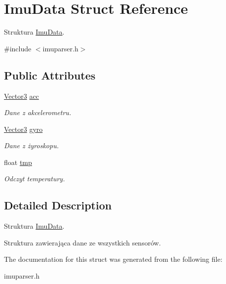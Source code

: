 \hypertarget{struct_imu_data}{}\section{Imu\+Data Struct Reference}
\label{struct_imu_data}


Struktura \mbox{\hyperlink{struct_imu_data}{Imu\+Data}}.  




{\ttfamily \#include $<$imuparser.\+h$>$}

\subsection*{Public Attributes}
\begin{DoxyCompactItemize}
\item 
\mbox{\label{struct_imu_data_af23da6309d3dc0dea3b76928a88c0200}} 
\mbox{\hyperlink{struct_vector3}{Vector3}} \mbox{\hyperlink{struct_imu_data_af23da6309d3dc0dea3b76928a88c0200}{acc}}
\begin{DoxyCompactList}\small\item\em Dane z akcelerometru. \end{DoxyCompactList}\item 
\mbox{\label{struct_imu_data_ad8f058e5c598956fee0edb4a4fd4ee26}} 
\mbox{\hyperlink{struct_vector3}{Vector3}} \mbox{\hyperlink{struct_imu_data_ad8f058e5c598956fee0edb4a4fd4ee26}{gyro}}
\begin{DoxyCompactList}\small\item\em Dane z żyroskopu. \end{DoxyCompactList}\item 
\mbox{\label{struct_imu_data_acdfc7ba573b3a40af9cb8c4d067c5a91}} 
float \mbox{\hyperlink{struct_imu_data_acdfc7ba573b3a40af9cb8c4d067c5a91}{tmp}}
\begin{DoxyCompactList}\small\item\em Odczyt temperatury. \end{DoxyCompactList}\end{DoxyCompactItemize}


\subsection{Detailed Description}
Struktura \mbox{\hyperlink{struct_imu_data}{Imu\+Data}}. 

Struktura zawierająca dane ze wszystkich sensorów. 

The documentation for this struct was generated from the following file\+:\begin{DoxyCompactItemize}
\item 
imuparser.\+h\end{DoxyCompactItemize}
